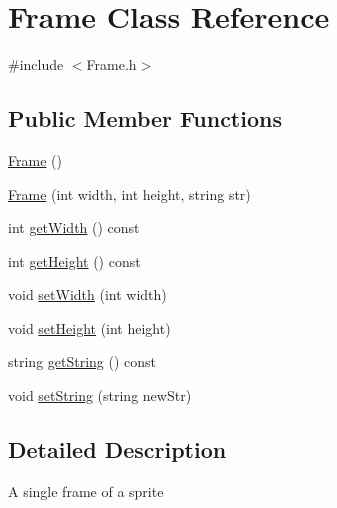 \hypertarget{class_frame}{\section{Frame Class Reference}
\label{class_frame}
}


{\ttfamily \#include $<$Frame.\+h$>$}

\subsection*{Public Member Functions}
\begin{DoxyCompactItemize}
\item 
\hyperlink{class_frame_ad2e5946cf41d4817e750500acf05d02b}{Frame} ()
\item 
\hyperlink{class_frame_a04960e256aeb88ea7594044b004d1d4f}{Frame} (int width, int height, string str)
\item 
int \hyperlink{class_frame_a6fdc35835bac73cebb16e5f9410f69a7}{get\+Width} () const 
\item 
int \hyperlink{class_frame_a01ee67899972b90ed68a86e9e741dd63}{get\+Height} () const 
\item 
void \hyperlink{class_frame_aa5399c4706ebfe13a7c9f2672855fb9b}{set\+Width} (int width)
\item 
void \hyperlink{class_frame_a88223ca58969c74eb0bf1710287229f6}{set\+Height} (int height)
\item 
string \hyperlink{class_frame_ab30188fbbd660c4f10dea8e038401b6a}{get\+String} () const 
\item 
void \hyperlink{class_frame_a54dd23fa6e469b2f6bf0a540a2e4e348}{set\+String} (string new\+Str)
\end{DoxyCompactItemize}


\subsection{Detailed Description}
A single frame of a sprite 

